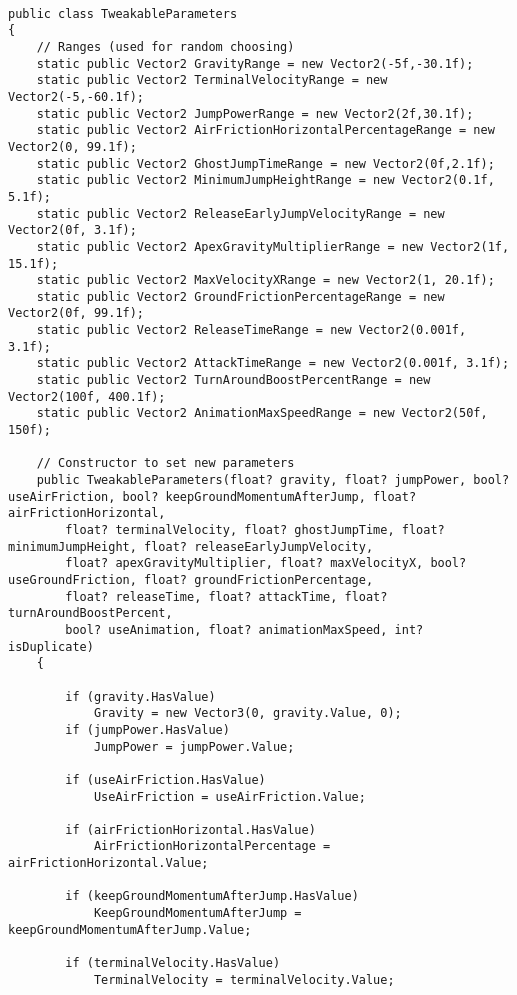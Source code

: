 \begin{lstlisting}

public class TweakableParameters
{
    // Ranges (used for random choosing)
    static public Vector2 GravityRange = new Vector2(-5f,-30.1f);
    static public Vector2 TerminalVelocityRange = new Vector2(-5,-60.1f);
    static public Vector2 JumpPowerRange = new Vector2(2f,30.1f);
    static public Vector2 AirFrictionHorizontalPercentageRange = new Vector2(0, 99.1f);
    static public Vector2 GhostJumpTimeRange = new Vector2(0f,2.1f);
    static public Vector2 MinimumJumpHeightRange = new Vector2(0.1f, 5.1f);
    static public Vector2 ReleaseEarlyJumpVelocityRange = new Vector2(0f, 3.1f);
    static public Vector2 ApexGravityMultiplierRange = new Vector2(1f, 15.1f);
    static public Vector2 MaxVelocityXRange = new Vector2(1, 20.1f);
    static public Vector2 GroundFrictionPercentageRange = new Vector2(0f, 99.1f);
    static public Vector2 ReleaseTimeRange = new Vector2(0.001f, 3.1f);
    static public Vector2 AttackTimeRange = new Vector2(0.001f, 3.1f);
    static public Vector2 TurnAroundBoostPercentRange = new Vector2(100f, 400.1f);
    static public Vector2 AnimationMaxSpeedRange = new Vector2(50f, 150f);

    // Constructor to set new parameters
    public TweakableParameters(float? gravity, float? jumpPower, bool? useAirFriction, bool? keepGroundMomentumAfterJump, float? airFrictionHorizontal,
        float? terminalVelocity, float? ghostJumpTime, float? minimumJumpHeight, float? releaseEarlyJumpVelocity,
        float? apexGravityMultiplier, float? maxVelocityX, bool? useGroundFriction, float? groundFrictionPercentage,
        float? releaseTime, float? attackTime, float? turnAroundBoostPercent,
        bool? useAnimation, float? animationMaxSpeed, int? isDuplicate)
    {

        if (gravity.HasValue)
            Gravity = new Vector3(0, gravity.Value, 0);
        if (jumpPower.HasValue)
            JumpPower = jumpPower.Value;
    
        if (useAirFriction.HasValue)
            UseAirFriction = useAirFriction.Value;

        if (airFrictionHorizontal.HasValue)
            AirFrictionHorizontalPercentage = airFrictionHorizontal.Value;

        if (keepGroundMomentumAfterJump.HasValue)
            KeepGroundMomentumAfterJump = keepGroundMomentumAfterJump.Value;

        if (terminalVelocity.HasValue)
            TerminalVelocity = terminalVelocity.Value;


\end{lstlisting}
